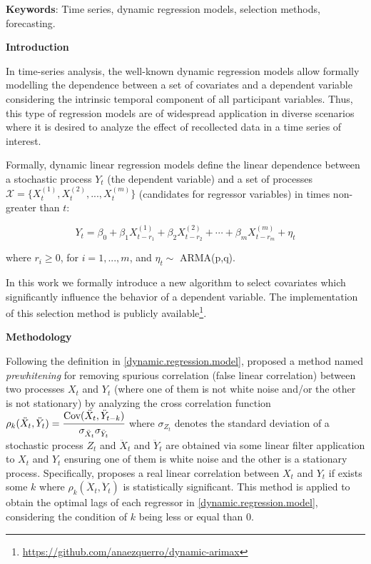 \documentclass[twoside]{article}
\begin{document}
\vspace{0.4cm}

\textbf{Keywords}: Time series, dynamic regression models, selection methods, forecasting.

\vspace{0.4cm}

\begin{center}
\textbf{Introduction}
\end{center}


In time-series analysis, the well-known dynamic regression models allow formally modelling the dependence between a set of covariates and a dependent variable considering the intrinsic temporal component of all participant variables. Thus, this type of regression models are of widespread application in diverse scenarios where it is desired to analyze the effect of recollected data in a time series of interest. 

Formally, dynamic linear regression models define the linear dependence between a stochastic process $Y_t$ (the dependent variable) and a set of processes  $\mathcal{X}=\{ X_t^{(1)}, X_t^{(2)}, ..., X_t^{(m)}\}$ (candidates for regressor variables) in times non-greater than $t$:

\begin{equation}\label{dynamic.regression.model}
Y_t = \beta_0 + \beta_1 X^{(1)}_{t-r_1} + \beta_2 X^{(2)}_{t-r_2} + \cdots + \beta_m  X^{(m)}_{t-r_m} + \eta_t 
\end{equation}

\noindent where $r_i \geq 0$, for $i=1,...,m$, and $\eta_t \sim$ ARMA(p,q).

In this work we formally introduce a new algorithm to select covariates which significantly influence the behavior of a dependent variable. The implementation of this selection method is publicly available\footnote{\url{https://github.com/anaezquerro/dynamic-arimax}}.




\begin{center}
\textbf{Methodology}
\end{center}

Following the definition in \ref{dynamic.regression.model}, \cite{cryer2008time} proposed a method named \textit{prewhitening} for removing spurious correlation (false linear correlation) between two processes $X_t$ and $Y_t$ (where one of them is not white noise and/or the other is not stationary) by analyzing the cross correlation function $\rho_k(\ddot{X}_t, \ddot{Y}_t) =  \cfrac{\text{Cov}(\ddot{X}_t, \ddot{Y}_{t-k})}{\sigma_{\ddot{X}_t} \sigma_{\ddot{Y}_t}} $ where $\sigma_{Z_t}$ denotes the standard deviation of a stochastic process $Z_t$ and $\ddot{X}_t$ and $\ddot{Y}_t$ are obtained via some linear filter application to $X_t$ and $Y_t$ ensuring one of them is white noise and the other is a stationary process. Specifically, \cite{cryer2008time} proposes a real linear correlation between $X_t$ and $Y_t$ if exists some $k$ where $\rho_k(\ddot{X}_t, \ddot{Y}_t)$ is statistically significant. This method is applied to obtain the optimal lags of each regressor in \ref{dynamic.regression.model}, considering the condition of $k$ being less or equal than $0$.
\end{document}
